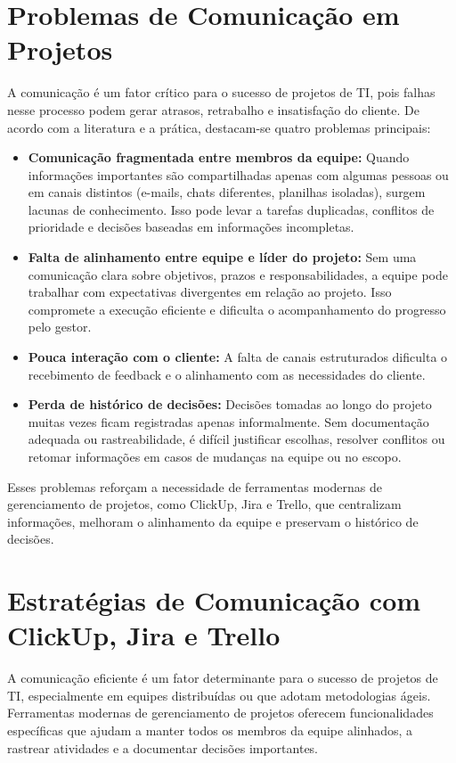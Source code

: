 \documentclass[12pt]{article}
\begin{document}
\section{Problemas de Comunicação em Projetos}
A comunicação é um fator crítico para o sucesso de projetos de TI, pois falhas nesse processo podem gerar atrasos, retrabalho e insatisfação do cliente. De acordo com a literatura e a prática, destacam-se quatro problemas principais:
\begin{itemize}
    \item \textbf{Comunicação fragmentada entre membros da equipe:} Quando informações importantes são compartilhadas apenas com algumas pessoas ou em canais distintos (e-mails, chats diferentes, planilhas isoladas), surgem lacunas de conhecimento. Isso pode levar a tarefas duplicadas, conflitos de prioridade e decisões baseadas em informações incompletas.
    \item \textbf{Falta de alinhamento entre equipe e líder do projeto:} Sem uma comunicação clara sobre objetivos, prazos e responsabilidades, a equipe pode trabalhar com expectativas divergentes em relação ao projeto. Isso compromete a execução eficiente e dificulta o acompanhamento do progresso pelo gestor.
    \item \textbf{Pouca interação com o cliente:} A falta de canais estruturados dificulta o recebimento de feedback e o alinhamento com as necessidades do cliente.
    \item \textbf{Perda de histórico de decisões:} Decisões tomadas ao longo do projeto muitas vezes ficam registradas apenas informalmente. Sem documentação adequada ou rastreabilidade, é difícil justificar escolhas, resolver conflitos ou retomar informações em casos de mudanças na equipe ou no escopo.
\end{itemize}
Esses problemas reforçam a necessidade de ferramentas modernas de gerenciamento de projetos, como ClickUp, Jira e Trello, que centralizam informações, melhoram o alinhamento da equipe e preservam o histórico de decisões.

\clearpage
\newpage

\section{Estratégias de Comunicação com ClickUp, Jira e Trello}

A comunicação eficiente é um fator determinante para o sucesso de projetos de TI, especialmente em equipes distribuídas ou que adotam metodologias ágeis. Ferramentas modernas de gerenciamento de projetos oferecem funcionalidades específicas que ajudam a manter todos os membros da equipe alinhados, a rastrear atividades e a documentar decisões importantes.
\end{document}
